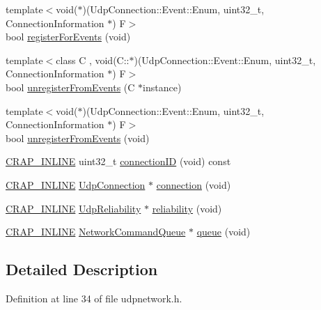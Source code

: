 \begin{DoxyCompactItemize}
\item 
{\footnotesize template$<$void($\ast$)(\+Udp\+Connection\+::\+Event\+::\+Enum, uint32\+\_\+t, Connection\+Information $\ast$) F$>$ }\\bool \hyperlink{classcrap_1_1_udp_network_a6511b5c7f871cceca81c827aeb75abdd}{register\+For\+Events} (void)
\item 
{\footnotesize template$<$class C , void(\+C\+::$\ast$)(\+Udp\+Connection\+::\+Event\+::\+Enum, uint32\+\_\+t, Connection\+Information $\ast$) F$>$ }\\bool \hyperlink{classcrap_1_1_udp_network_a0c5c0732d1ec608c9347ad4393179d36}{unregister\+From\+Events} (C $\ast$instance)
\item 
{\footnotesize template$<$void($\ast$)(\+Udp\+Connection\+::\+Event\+::\+Enum, uint32\+\_\+t, Connection\+Information $\ast$) F$>$ }\\bool \hyperlink{classcrap_1_1_udp_network_af5129d1be9ba7226136d0e92472c1c69}{unregister\+From\+Events} (void)
\item 
\hyperlink{config__x86_8h_a5a40526b8d842e7ff731509998bb0f1c}{C\+R\+A\+P\+\_\+\+I\+N\+L\+I\+N\+E} uint32\+\_\+t \hyperlink{classcrap_1_1_udp_network_a074201156d578bccc65960e3213c052e}{connection\+I\+D} (void) const 
\item 
\hyperlink{config__x86_8h_a5a40526b8d842e7ff731509998bb0f1c}{C\+R\+A\+P\+\_\+\+I\+N\+L\+I\+N\+E} \hyperlink{classcrap_1_1_udp_connection}{Udp\+Connection} $\ast$ \hyperlink{classcrap_1_1_udp_network_a648d383e15d72f4b5c530dbe013c6488}{connection} (void)
\item 
\hyperlink{config__x86_8h_a5a40526b8d842e7ff731509998bb0f1c}{C\+R\+A\+P\+\_\+\+I\+N\+L\+I\+N\+E} \hyperlink{classcrap_1_1_udp_reliability}{Udp\+Reliability} $\ast$ \hyperlink{classcrap_1_1_udp_network_a02b2e8dcf7f59e09abf45812d19d748a}{reliability} (void)
\item 
\hyperlink{config__x86_8h_a5a40526b8d842e7ff731509998bb0f1c}{C\+R\+A\+P\+\_\+\+I\+N\+L\+I\+N\+E} \hyperlink{classcrap_1_1_network_command_queue}{Network\+Command\+Queue} $\ast$ \hyperlink{classcrap_1_1_udp_network_a9853fe5cfc3fef264dc172d3916a7e68}{queue} (void)
\end{DoxyCompactItemize}


\subsection{Detailed Description}


Definition at line 34 of file udpnetwork.\+h.



